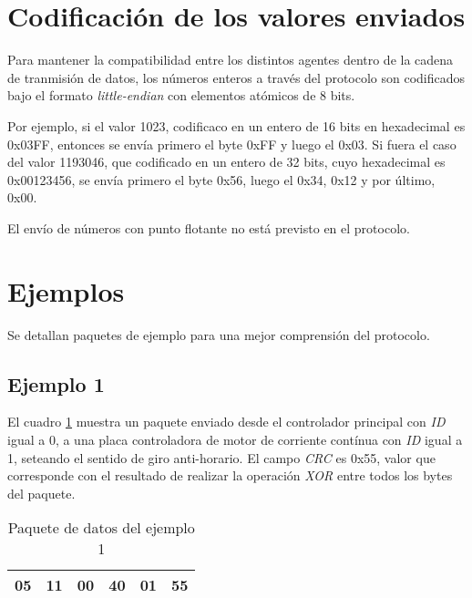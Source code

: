 \documentclass[a4paper,10pt]{article}
\begin{document}
\section{Codificaci\'on de los valores enviados}
\label{codificacion}

Para mantener la compatibilidad entre los distintos agentes dentro de la cadena de tranmisi\'on de datos,
los n\'umeros enteros a trav\'es del protocolo son codificados bajo el formato \emph{little-endian} con elementos at\'omicos de 8 bits.

Por ejemplo, si el valor 1023, codificaco en un entero de 16 bits en hexadecimal es 0x03FF,
entonces se env\'ia primero el byte 0xFF y luego el 0x03.
Si fuera el caso del valor 1193046, que codificado en un entero de 32 bits, cuyo hexadecimal es 0x00123456,
se env\'ia primero el byte 0x56, luego el 0x34, 0x12 y por \'ultimo, 0x00.

El env\'io de n\'umeros con punto flotante no est\'a previsto en el protocolo.

\section{Ejemplos}
\label{ejemplos}

Se detallan paquetes de ejemplo para una mejor comprensi\'on del protocolo.

\subsection{Ejemplo 1}
\label{ejemplo1}

El cuadro \ref{paquete_ejemplo1} muestra un paquete enviado desde el controlador principal con \emph{ID} igual a 0,
a una placa controladora de motor de corriente cont\'inua con \emph{ID} igual a 1, seteando el sentido de giro anti-horario.
El campo \emph{CRC} es 0x55, valor que corresponde con el resultado de realizar la operaci\'on \emph{XOR} entre
todos los bytes del paquete.

\begin{table}[h]
\begin{center}
\begin{tabular}{|c|c|c|c|c|c|}
\hline
05 & 11 & 00 & 40 & 01 & 55 \\
\hline
\end{tabular}
\caption{Paquete de datos del ejemplo 1}
\label{paquete_ejemplo1}
\end{center}
\end{table}
\end{document}
